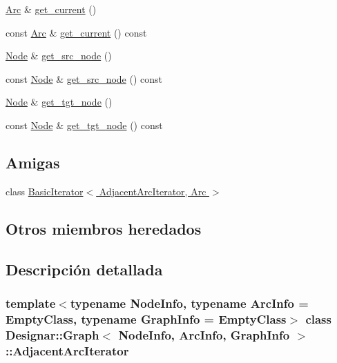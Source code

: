 \begin{DoxyCompactItemize}
\hyperlink{class_designar_1_1_graph_a74c730ef4ce2d20f998d72bd25c2b5bf}{Arc} \& \hyperlink{class_designar_1_1_graph_1_1_adjacent_arc_iterator_a8d4383e587b5a1203581c2c2616ab45f}{get\+\_\+current} ()
\item 
const \hyperlink{class_designar_1_1_graph_a74c730ef4ce2d20f998d72bd25c2b5bf}{Arc} \& \hyperlink{class_designar_1_1_graph_1_1_adjacent_arc_iterator_a42865c7e33a047eb16ef49428ec99e35}{get\+\_\+current} () const
\item 
\hyperlink{class_designar_1_1_graph_a5dfc7dba9d092ac489c72e40390c37d0}{Node} \& \hyperlink{class_designar_1_1_graph_1_1_adjacent_arc_iterator_a0a5f3238f6abde756b4498a31558a255}{get\+\_\+src\+\_\+node} ()
\item 
const \hyperlink{class_designar_1_1_graph_a5dfc7dba9d092ac489c72e40390c37d0}{Node} \& \hyperlink{class_designar_1_1_graph_1_1_adjacent_arc_iterator_ae4ba07319b439cc08df6c957a61bc224}{get\+\_\+src\+\_\+node} () const
\item 
\hyperlink{class_designar_1_1_graph_a5dfc7dba9d092ac489c72e40390c37d0}{Node} \& \hyperlink{class_designar_1_1_graph_1_1_adjacent_arc_iterator_a400e7399fa39eb49e64afcd2d0b26ff6}{get\+\_\+tgt\+\_\+node} ()
\item 
const \hyperlink{class_designar_1_1_graph_a5dfc7dba9d092ac489c72e40390c37d0}{Node} \& \hyperlink{class_designar_1_1_graph_1_1_adjacent_arc_iterator_a6f6a71103fa126fd3317af40844022a1}{get\+\_\+tgt\+\_\+node} () const
\end{DoxyCompactItemize}
\subsection*{Amigas}
\begin{DoxyCompactItemize}
\item 
class \hyperlink{class_designar_1_1_graph_1_1_adjacent_arc_iterator_a73ad70d76f3331ee4b07451db1347918}{Basic\+Iterator$<$ Adjacent\+Arc\+Iterator, Arc $>$}
\end{DoxyCompactItemize}
\subsection*{Otros miembros heredados}


\subsection{Descripción detallada}
\subsubsection*{template$<$typename Node\+Info, typename Arc\+Info = Empty\+Class, typename Graph\+Info = Empty\+Class$>$\newline
class Designar\+::\+Graph$<$ Node\+Info, Arc\+Info, Graph\+Info $>$\+::\+Adjacent\+Arc\+Iterator}



